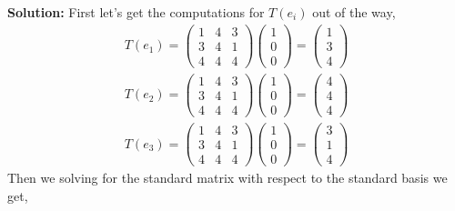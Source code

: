 \documentclass[12pt]{article}
\begin{document}
\begin{itemize}
    \textbf{Solution:} First let's get the computations for $T(e_i)$ out of the way,
        \begin{align*}
            T(e_1) = \begin{pmatrix}
                1 & 4 & 3 \\ 3 & 4 & 1 \\ 4 & 4 & 4
            \end{pmatrix} \begin{pmatrix}
                1 \\ 0 \\ 0
            \end{pmatrix} = \begin{pmatrix}
                1 \\ 3 \\ 4
            \end{pmatrix} \\ 
            T(e_2) = \begin{pmatrix}
                1 & 4 & 3 \\ 3 & 4 & 1 \\ 4 & 4 & 4
            \end{pmatrix} \begin{pmatrix}
                1 \\ 0 \\ 0
            \end{pmatrix} = \begin{pmatrix}
                4\\ 4 \\ 4
            \end{pmatrix} \\
            T(e_3) = \begin{pmatrix}
                1 & 4 & 3 \\ 3 & 4 & 1 \\ 4 & 4 & 4
            \end{pmatrix} \begin{pmatrix}
                1 \\ 0 \\ 0
            \end{pmatrix} = \begin{pmatrix}
                3 \\ 1 \\ 4
            \end{pmatrix}
        \end{align*}
    Then we solving for the standard matrix with respect to the standard basis we get,
    \begin{align*}

\end{align*}
\end{itemize}
\end{document}
